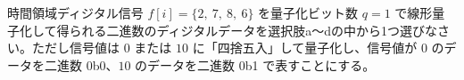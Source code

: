 時間領域ディジタル信号 $f[i] = \{2,\ 7,\ 8,\ 6 \}$ を量子化ビット数 $q = 1$ で線形量子化して得られる二進数のディジタルデータを選択肢a〜dの中から1つ選びなさい。ただし信号値は $0$ または $10$ に「四捨五入」して量子化し、信号値が $0$ のデータを二進数 0b0、$10$ のデータを二進数 0b1 で表すことにする。

